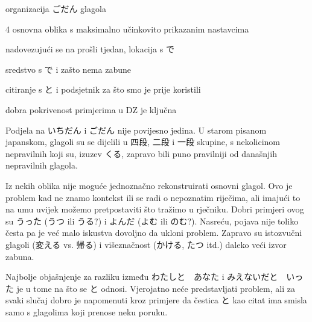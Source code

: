 
\author{Tomislav Mamić}

	
	
	\vspace{-10pt}
	\begin{hyou}
		\item organizacija ごだん glagola
		\item 4 osnovna oblika s maksimalno učinkovito prikazanim nastavcima
		\item nadovezujući se na prošli tjedan, lokacija s で
		\item sredstvo s で i zašto nema zabune
		\item citiranje s と i podsjetnik za što smo je prije koristili
		\item dobra pokrivenost primjerima u DZ je ključna
	\end{hyou}

	
	Podjela na いちだん i ごだん nije povijesno jedina. U starom pisanom japanskom, glagoli su se dijelili u 四段, 二段 i 一段 skupine, s nekolicinom nepravilnih koji su, izuzev くる, zapravo bili puno pravilniji od današnjih nepravilnih glagola.
	
	Iz nekih oblika nije moguće jednoznačno rekonstruirati osnovni glagol. Ovo je problem kad ne znamo kontekst ili se radi o nepoznatim riječima, ali imajući to na umu uvijek možemo pretpostaviti što tražimo u rječniku. Dobri primjeri ovog su うった (うつ ili うる?) i よんだ (よむ ili のむ?). Nasreću, pojava nije toliko česta pa je već malo iskustva dovoljno da ukloni problem. Zapravo su istozvučni glagoli (変える vs. 帰る) i višeznačnost (かける, たつ itd.) daleko veći izvor zabuna.
	
	Najbolje objašnjenje za razliku između わたしと　あなた i みえないだと　いった je u tome na što se と odnosi. Vjerojatno neće predstavljati problem, ali za svaki slučaj dobro je napomenuti kroz primjere da čestica と kao citat ima smisla samo s glagolima koji prenose neku poruku.
